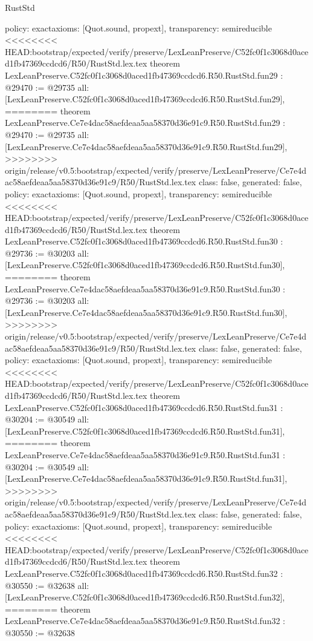 \begin{lexlean}{RustStd}
\begin{coremodule}
{\begin{coremodule}
{{{{{{{{{{{{{{{{{{{{{{{{{{{{{{{{  policy: exact{axioms: [Quot.sound, propext]},
  transparency: semireducible
}
<<<<<<<< HEAD:bootstrap/expected/verify/preserve/LexLeanPreserve/C52fc0f1c3068d0aced1fb47369ccdcd6/R50/RustStd.lex.tex
theorem LexLeanPreserve.C52fc0f1c3068d0aced1fb47369ccdcd6.R50.RustStd.fun29 : @29470 := @29735 {
  all: [LexLeanPreserve.C52fc0f1c3068d0aced1fb47369ccdcd6.R50.RustStd.fun29],
========
theorem LexLeanPreserve.Ce7e4dac58aefdeaa5aa58370d36e91c9.R50.RustStd.fun29 : @29470 := @29735 {
  all: [LexLeanPreserve.Ce7e4dac58aefdeaa5aa58370d36e91c9.R50.RustStd.fun29],
>>>>>>>> origin/release/v0.5:bootstrap/expected/verify/preserve/LexLeanPreserve/Ce7e4dac58aefdeaa5aa58370d36e91c9/R50/RustStd.lex.tex
  class: false,
  generated: false,
  policy: exact{axioms: [Quot.sound, propext]},
  transparency: semireducible
}
<<<<<<<< HEAD:bootstrap/expected/verify/preserve/LexLeanPreserve/C52fc0f1c3068d0aced1fb47369ccdcd6/R50/RustStd.lex.tex
theorem LexLeanPreserve.C52fc0f1c3068d0aced1fb47369ccdcd6.R50.RustStd.fun30 : @29736 := @30203 {
  all: [LexLeanPreserve.C52fc0f1c3068d0aced1fb47369ccdcd6.R50.RustStd.fun30],
========
theorem LexLeanPreserve.Ce7e4dac58aefdeaa5aa58370d36e91c9.R50.RustStd.fun30 : @29736 := @30203 {
  all: [LexLeanPreserve.Ce7e4dac58aefdeaa5aa58370d36e91c9.R50.RustStd.fun30],
>>>>>>>> origin/release/v0.5:bootstrap/expected/verify/preserve/LexLeanPreserve/Ce7e4dac58aefdeaa5aa58370d36e91c9/R50/RustStd.lex.tex
  class: false,
  generated: false,
  policy: exact{axioms: [Quot.sound, propext]},
  transparency: semireducible
}
<<<<<<<< HEAD:bootstrap/expected/verify/preserve/LexLeanPreserve/C52fc0f1c3068d0aced1fb47369ccdcd6/R50/RustStd.lex.tex
theorem LexLeanPreserve.C52fc0f1c3068d0aced1fb47369ccdcd6.R50.RustStd.fun31 : @30204 := @30549 {
  all: [LexLeanPreserve.C52fc0f1c3068d0aced1fb47369ccdcd6.R50.RustStd.fun31],
========
theorem LexLeanPreserve.Ce7e4dac58aefdeaa5aa58370d36e91c9.R50.RustStd.fun31 : @30204 := @30549 {
  all: [LexLeanPreserve.Ce7e4dac58aefdeaa5aa58370d36e91c9.R50.RustStd.fun31],
>>>>>>>> origin/release/v0.5:bootstrap/expected/verify/preserve/LexLeanPreserve/Ce7e4dac58aefdeaa5aa58370d36e91c9/R50/RustStd.lex.tex
  class: false,
  generated: false,
  policy: exact{axioms: [Quot.sound, propext]},
  transparency: semireducible
}
<<<<<<<< HEAD:bootstrap/expected/verify/preserve/LexLeanPreserve/C52fc0f1c3068d0aced1fb47369ccdcd6/R50/RustStd.lex.tex
theorem LexLeanPreserve.C52fc0f1c3068d0aced1fb47369ccdcd6.R50.RustStd.fun32 : @30550 := @32638 {
  all: [LexLeanPreserve.C52fc0f1c3068d0aced1fb47369ccdcd6.R50.RustStd.fun32],
========
theorem LexLeanPreserve.Ce7e4dac58aefdeaa5aa58370d36e91c9.R50.RustStd.fun32 : @30550 := @32638 {
}}}}}}}}}}}}}}}}}}}}}}}}}}}}}}}}}}}}
\end{coremodule}}
\end{coremodule}
\end{lexlean}
